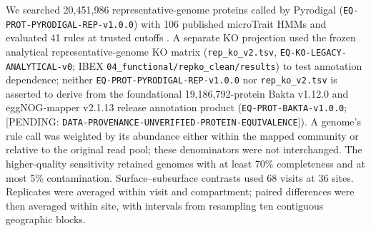 {We searched 20,451,986 representative-genome proteins called by Pyrodigal (\texttt{EQ-\allowbreak PROT-\allowbreak PYRODIGAL-\allowbreak REP-\allowbreak v1.0.0}) with 106 published microTrait HMMs and evaluated 41 rules at trusted cutoffs \citep{karaoz2022microtrait}. A separate KO projection used the frozen analytical representative-genome KO matrix (\texttt{rep\_\allowbreak ko\_\allowbreak v2.tsv}, \texttt{EQ-\allowbreak KO-\allowbreak LEGACY-\allowbreak ANALYTICAL-\allowbreak v0}; IBEX \texttt{04\_\allowbreak functional/\allowbreak repko\_\allowbreak clean/\allowbreak results}) to test annotation dependence; neither \texttt{EQ-\allowbreak PROT-\allowbreak PYRODIGAL-\allowbreak REP-\allowbreak v1.0.0} nor \texttt{rep\_\allowbreak ko\_\allowbreak v2.tsv} is asserted to derive from the foundational 19,186,792-protein Bakta v1.12.0 and eggNOG-mapper v2.1.13 release annotation product (\texttt{EQ-\allowbreak PROT-\allowbreak BAKTA-\allowbreak v1.0.0}; [PENDING: \texttt{DATA-\allowbreak PROVENANCE-\allowbreak UNVERIFIED-\allowbreak PROTEIN-\allowbreak EQUIVALENCE}]). A genome's rule call was weighted by its abundance either within the mapped community or relative to the original read pool; these denominators were not interchanged. The higher-quality sensitivity retained genomes with at least 70\% completeness and at most 5\% contamination. Surface--subsurface contrasts used 68 visits at 36 sites. Replicates were averaged within visit and compartment; paired differences were then averaged within site, with intervals from resampling ten contiguous geographic blocks.

}
